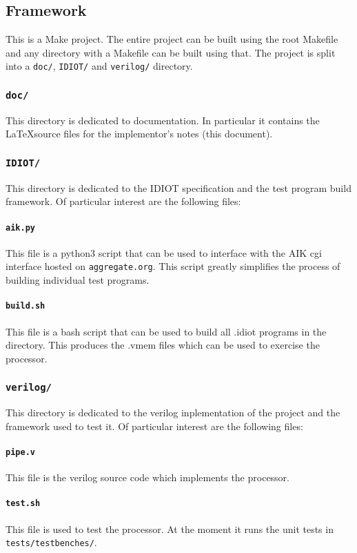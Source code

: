 \documentclass[conference]{IEEEtran}
\begin{document}
\subsection{Framework}
This is a Make project. The entire project can be built using the root Makefile
and any directory with a Makefile can be built using that. The project is split
into a \texttt{doc/}, 
\texttt{IDIOT/} and \texttt{verilog/} directory.
\subsubsection{\texttt{doc/}}
This directory is dedicated to documentation. In particular it contains the
\LaTeX source files for the implementor's notes (this document).
\subsubsection{\texttt{IDIOT/}}
This directory is dedicated to the IDIOT specification and the test program
build framework. Of particular interest are the following files:
\paragraph{\texttt{aik.py}} This file is a python3 script that can be used
to interface with the AIK cgi interface hosted on \texttt{aggregate.org}.
This script greatly simplifies the process of building individual test 
programs.
\paragraph{\texttt{build.sh}} This file is a bash script that can be used
to build all .idiot programs in the directory. This produces the .vmem files
which can be used to exercise the processor.
\subsubsection{\texttt{verilog/}}
This directory is dedicated to the verilog inplementation of the project and
the framework used to test it. Of particular interest are the following files:
\paragraph{\texttt{pipe.v}} This file is the verilog source code which 
implements the processor. 
\paragraph{\texttt{test.sh}} This file is used to test the processor. At
the moment it runs the unit tests in \texttt{tests/testbenches/}.
\end{document}
